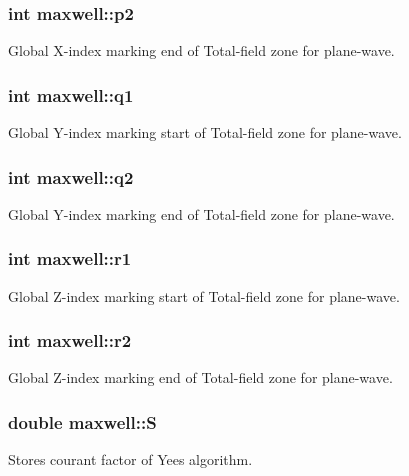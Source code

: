 \subsubsection[{\texorpdfstring{p2}{p2}}]{\setlength{\rightskip}{0pt plus 5cm}int maxwell\+::p2}\hypertarget{classmaxwell_abde91396e5a8882df43725baca204d7d}{}\label{classmaxwell_abde91396e5a8882df43725baca204d7d}
Global X-\/index marking end of Total-\/field zone for plane-\/wave. 
\subsubsection[{\texorpdfstring{q1}{q1}}]{\setlength{\rightskip}{0pt plus 5cm}int maxwell\+::q1}\hypertarget{classmaxwell_af6c514d210b2c78825dca5ffeacace6c}{}\label{classmaxwell_af6c514d210b2c78825dca5ffeacace6c}
Global Y-\/index marking start of Total-\/field zone for plane-\/wave. 
\subsubsection[{\texorpdfstring{q2}{q2}}]{\setlength{\rightskip}{0pt plus 5cm}int maxwell\+::q2}\hypertarget{classmaxwell_a35b17d1913c5aff045695fb688525115}{}\label{classmaxwell_a35b17d1913c5aff045695fb688525115}
Global Y-\/index marking end of Total-\/field zone for plane-\/wave. 
\subsubsection[{\texorpdfstring{r1}{r1}}]{\setlength{\rightskip}{0pt plus 5cm}int maxwell\+::r1}\hypertarget{classmaxwell_ab07e9e4e8a20cc8589b2a571ba71d528}{}\label{classmaxwell_ab07e9e4e8a20cc8589b2a571ba71d528}
Global Z-\/index marking start of Total-\/field zone for plane-\/wave. 
\subsubsection[{\texorpdfstring{r2}{r2}}]{\setlength{\rightskip}{0pt plus 5cm}int maxwell\+::r2}\hypertarget{classmaxwell_a959502e24d5d905521da8bb2aa4e4780}{}\label{classmaxwell_a959502e24d5d905521da8bb2aa4e4780}
Global Z-\/index marking end of Total-\/field zone for plane-\/wave. 
\subsubsection[{\texorpdfstring{S}{S}}]{\setlength{\rightskip}{0pt plus 5cm}double maxwell\+::S}\hypertarget{classmaxwell_a97ae068093d3316f05b737029c4b848e}{}\label{classmaxwell_a97ae068093d3316f05b737029c4b848e}
Stores courant factor of Yee\textquotesingle{}s algorithm. 
